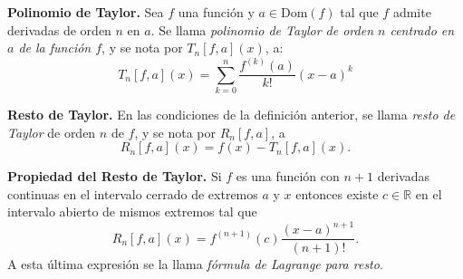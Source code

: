 \begin{definition}{\textbf{Polinomio de Taylor.}}
    Sea $f$ una función  y  $a \in \text{Dom}(f)$ tal que $f$ admite derivadas de orden $n$ en $a$. Se llama \textit{polinomio de Taylor de orden $n$ centrado en $a$ de la función $f$}, y se nota por $T_n[f,a](x)$, a:
    \begin{equation*}
        T_n[f,a](x) = \sum^n_{k=0} \frac{f^{(k)}(a)}{k!}(x-a)^k 
    \end{equation*}
    \label{def:PolTaylor}
\end{definition}

\begin{definition}{\textbf{Resto de Taylor.}}
  En las condiciones de la definici\'on anterior,  se llama \textit{resto de Taylor} de orden $n$ de $f$, y se nota por $  R_n[f,a]$, a
    \begin{equation*}
        R_n[f,a](x) = f(x)-T_n[f,a](x).
    \end{equation*}
 \end{definition} 
   
  \begin{propertie}{\textbf{Propiedad del Resto de Taylor.}}  Si $f$ es  una función con $n+1$ derivadas continuas  en el intervalo cerrado de extremos $a$ y $x$ entonces 
    existe $c\in\mathbb{R}$ en el intervalo abierto de mismos extremos tal que
    \begin{equation*}
        R_n[f,a](x) = f^{(n+1)}(c)\frac{(x-a)^{n+1}}{(n+1)!}.
    \end{equation*}
    A esta última expresi\'on se la llama \textit{fórmula de Lagrange para resto}.
    \label{def:RestoTaylor}
\end{propertie}